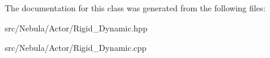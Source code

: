 \-The documentation for this class was generated from the following files\-:\begin{DoxyCompactItemize}
\item 
src/\-Nebula/\-Actor/\-Rigid\-\_\-\-Dynamic.\-hpp\item 
src/\-Nebula/\-Actor/\-Rigid\-\_\-\-Dynamic.\-cpp\end{DoxyCompactItemize}
